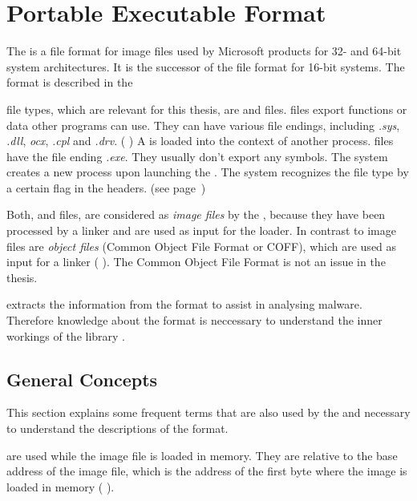 \chapter{Portable Executable Format} \label{chap:peformat}

The \PE{} is a file format for image files used by Microsoft products for 32- and 64-bit system architectures. It is the successor of the \NZ{} file format for 16-bit systems. The \PE{} format is described in the \PECOFF{} \cite{pespec}

\PE{} file types, which are relevant for this thesis, are \DLL{} and \EXE{} files. \DLL{} files export functions or data other programs can use. They can have various file endings, including \emph{.sys}, \emph{.dll}, \emph{ocx}, \emph{.cpl} and \emph{.drv}. (\cf{} \cite{micrdll}) A \DLL{} is loaded into the context of another process.
\EXE{} files have the file ending \emph{.exe}. They usually don't export any symbols. The system creates a new process upon launching the \EXE{}.
The system recognizes the file type by a certain flag in the \PE{} headers. (see page~\pageref{dllflag}) 

Both, \EXE{} and \DLL{} files, are considered as \emph{image files} by the \PECOFF{}, because they have been processed by a linker and are used as input for the loader. In contrast to image files are \emph{object files} (Common Object File Format or {COFF}), which are used as input for a linker (\cf{} \cite[]{pespec}). The Common Object File Format is not an issue in the thesis.

\portex{} extracts the information from the \PE{} format to assist in analysing malware. Therefore knowledge about the \PE{} format is neccessary to understand the inner workings of the library \portex{}. 

\section{General Concepts}


This section explains some frequent terms that are also used by the \PECOFF{} and necessary to understand the descriptions of the \PE{} format.

\begin{definition}[RVA]
\emph{} are used while the image file is loaded in memory. They are relative to the base address of the image file, which is the address of the first byte where the image is loaded in memory (\cf{} \cite[]{pespec}).
\end{definition} 

